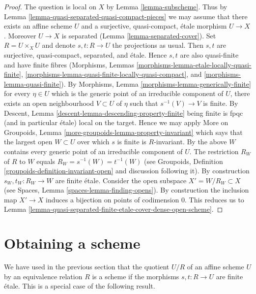 \begin{proof}
The question is local on $X$ by Lemma \ref{lemma-subscheme}.
Thus by Lemma \ref{lemma-quasi-separated-quasi-compact-pieces}
we may assume that there exists an affine scheme $U$ and a
surjective, quasi-compact, \'etale morphism $U \to X$.
Moreover $U \to X$ is separated (Lemma \ref{lemma-separated-cover}).
Set $R = U \times_X U$ and denote $s, t : R \to U$ the projections
as usual. Then $s, t$ are surjective, quasi-compact, separated, and
\'etale. Hence $s, t$ are also quasi-finite and have finite fibres
(Morphisms,
Lemmas \ref{morphisms-lemma-etale-locally-quasi-finite},
\ref{morphisms-lemma-quasi-finite-locally-quasi-compact}, and
\ref{morphisms-lemma-quasi-finite}).
By Morphisms, Lemma \ref{morphisms-lemma-generically-finite}
for every $\eta \in U$ which is the generic point of an
irreducible component of $U$, there exists an open neighbourhood
$V \subset U$ of $\eta$ such that $s^{-1}(V) \to V$ is finite. By
Descent, Lemma \ref{descent-lemma-descending-property-finite}
being finite is fpqc (and in particular \'etale) local on the target.
Hence we may apply
More on Groupoids, Lemma \ref{more-groupoids-lemma-property-invariant}
which says that the largest open $W \subset U$ over which $s$ is
finite is $R$-invariant. By the above $W$ contains every
generic point of an irreducible component of $U$.
The restriction $R_W$ of $R$ to $W$ equals $R_W = s^{-1}(W) = t^{-1}(W)$
(see Groupoids, Definition \ref{groupoids-definition-invariant-open}
and discussion following it).
By construction $s_W, t_W : R_W \to W$ are finite \'etale.
Consider the open subspace $X' = W/R_W \subset X$ (see
Spaces, Lemma \ref{spaces-lemma-finding-opens}).
By construction the inclusion map $X' \to X$
induces a bijection on points of codimension $0$.
This reduces us to
Lemma \ref{lemma-quasi-separated-finite-etale-cover-dense-open-scheme}.
\end{proof}




\section{Obtaining a scheme}
\label{section-getting-a-scheme}

\noindent
We have used in the previous section that the quotient $U/R$ of an
affine scheme $U$ by an equivalence relation $R$ is a scheme if the
morphisms $s, t : R \to U$ are finite \'etale. This is a special case
of the following result.

